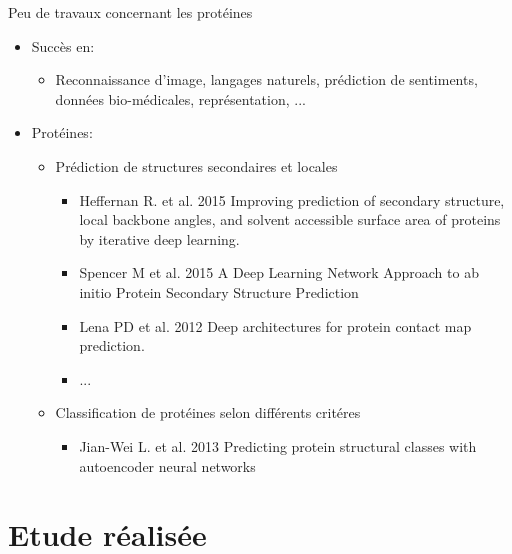 \documentclass{beamer}
\begin{document}
\begin{frame}{Peu de travaux concernant les protéines}

      \begin{itemize}
      \item Succès en:\pause
        \begin{itemize}
        \item Reconnaissance d'image, langages naturels,
          prédiction de sentiments, données bio-médicales,
          représentation, ...\pause
        \end{itemize}
      \end{itemize}


      \begin{itemize}
      \item Protéines:
        \begin{itemize}
        \item Prédiction de structures secondaires et locales\pause
          \begin{itemize}
          \item Heffernan R. et al. 2015 Improving prediction of secondary
            structure, local backbone angles, and solvent accessible surface
            area of proteins by iterative deep learning. \pause
          \item Spencer M et al. 2015 A Deep Learning Network Approach to ab
            initio Protein Secondary Structure Prediction\pause
          \item Lena PD et al. 2012 Deep architectures for protein contact
            map prediction. \pause
          \item ...\pause
          \end{itemize}
        \item Classification de protéines selon différents critéres\pause
          \begin{itemize}
          \item Jian-Wei L. et al. 2013 Predicting protein structural classes with autoencoder neural networks
          \end{itemize}
        \end{itemize}
      \end{itemize}


\end{frame}

\section{Etude réalisée}
\end{document}
